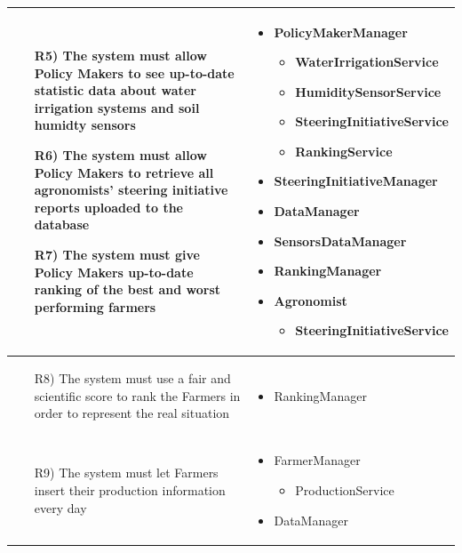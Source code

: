 \documentclass[table, 12pt]{article}
\begin{document}
\begin{longtable}{|p{}|p{}|}
    \begin{itemize}
        \item[R5)] The system must allow Policy Makers to see up-to-date statistic data about water irrigation systems and soil humidty sensors
        \item[R6)] The system must allow Policy Makers to retrieve all agronomists' steering initiative reports uploaded to the database
        \item[R7)] The system must give Policy Makers up-to-date ranking of the best and worst performing farmers  
    \end{itemize}
    & 
    \begin{itemize}
        \item PolicyMakerManager
        \begin{itemize}
            \item WaterIrrigationService
            \item HumiditySensorService
            \item SteeringInitiativeService
            \item RankingService
        \end{itemize}
        \item SteeringInitiativeManager
        \item DataManager
        \item SensorsDataManager
        \item RankingManager
        \item Agronomist
        \begin{itemize}
            \item SteeringInitiativeService
        \end{itemize}
    \end{itemize}
    \\\hline

    \begin{itemize}
        \item[R8)] The system must use a fair and scientific score to rank the Farmers in order to represent the real situation 
    \end{itemize}
    & 
    \begin{itemize}
        \item RankingManager
    \end{itemize}
    \\\hline

    \begin{itemize}
        \item[R9)] The system must let Farmers insert their production information every day 
    \end{itemize}
    &
    \begin{itemize}
        \item FarmerManager
        \begin{itemize}
            \item ProductionService
        \end{itemize}
        \item DataManager
    \end{itemize}
    \\\hline


\end{longtable}
\end{document}
